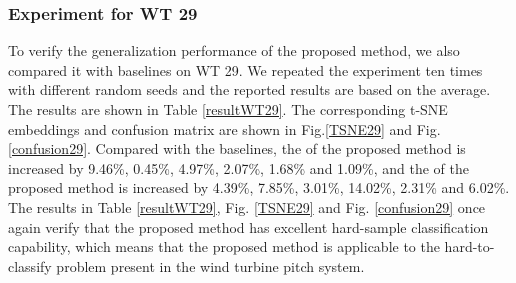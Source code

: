 \documentclass[lettersize,journal]{IEEEtran}
\begin{document}
\subsubsection{Experiment for WT 29}

To verify the generalization performance of the proposed method, we also compared it with baselines on WT 29. We repeated the experiment ten times with different random seeds and the reported results are based on the average. The results are shown in Table \ref{resultWT29}. The corresponding t-SNE embeddings and confusion matrix are shown in Fig.\ref{TSNE29} and Fig.\ref{confusion29}.  Compared with the baselines, the  of the proposed method is increased by 9.46\%, 0.45\%, 4.97\%, 2.07\%, 1.68\% and 1.09\%, and the  of the proposed method is increased by 4.39\%, 7.85\%, 3.01\%, 14.02\%, 2.31\% and 6.02\%. The results in Table \ref{resultWT29}, Fig. \ref{TSNE29} and Fig. \ref{confusion29} once again verify that the proposed method has excellent hard-sample classification capability, which means that the proposed method is applicable to the hard-to-classify problem present in the wind turbine pitch system.

\end{document}
